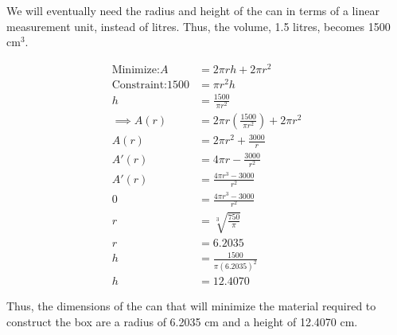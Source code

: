         \noindent We will eventually need the radius and height of the can in terms of a linear
        measurement unit, instead of litres. Thus, the volume, 1.5 litres, becomes 1500 $\text{cm}^3$.

        \begin{align*}
            \text{Minimize:} A      &= 2\pi rh+2\pi r^2 \\
            \text{Constraint:} 1500 &= \pi r^2 h \\
            h                       &= \frac{1500}{\pi r^2} \\
            \implies A(r)           &= 2\pi r\left(\frac{1500}{\pi r^2}\right) + 2\pi r^2 \\
            A(r)                    &= 2\pi r^2 + \frac{3000}{r} \\
            A'(r)                   &= 4\pi r - \frac{3000}{r^2} \\
            A'(r)                   &= \frac{4\pi r^3 - 3000}{r^2} \\
            0                       &= \frac{4\pi r^3 - 3000}{r^2} \\
            r                       &= \sqrt[3]{\frac{750}{\pi}} \\
            r                       &= 6.2035 \\
            h                       &= \frac{1500}{\pi(6.2035)^2} \\
            h                       &= 12.4070
        \end{align*}

        \noindent Thus, the dimensions of the can that will minimize the material required to
        construct the box are a radius of 6.2035 cm and a height of 12.4070 cm.